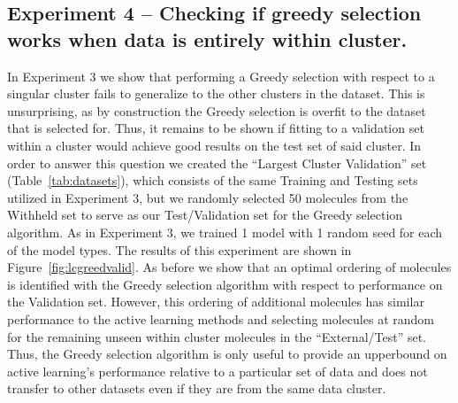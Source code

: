 \documentclass[journal=jmcmar,manuscript=article]{achemso}
\begin{document}
\subsection{Experiment 4 -- Checking if greedy selection works when data is entirely within cluster.}

In Experiment 3 we show that performing a Greedy selection with respect to a singular cluster fails to generalize to the other clusters in the dataset. This is unsurprising, as by construction the Greedy selection is overfit to the dataset that is selected for. Thus, it remains to be shown if fitting to a validation set within a cluster would achieve good results on the test set of said cluster. In order to answer this question we created the ``Largest Cluster Validation'' set (Table~\ref{tab:datasets}), which consists of the same Training and Testing sets utilized in Experiment 3, but we randomly selected 50 molecules from the Withheld set to serve as our Test/Validation set for the Greedy selection algorithm. As in Experiment 3, we trained 1 model with 1 random seed for each of the model types. The results of this experiment are shown in Figure~\ref{fig:lcgreedvalid}. As before we show that an optimal ordering of molecules is identified with the Greedy selection algorithm with respect to performance on the Validation set. However, this ordering of additional molecules has similar performance to the active learning methods and selecting molecules at random for the remaining unseen within cluster molecules in the ``External/Test'' set. Thus, the Greedy selection algorithm is only useful to provide an upperbound on active learning's performance relative to a particular set of data and does not transfer to other datasets even if they are from the same data cluster.
\end{document}
